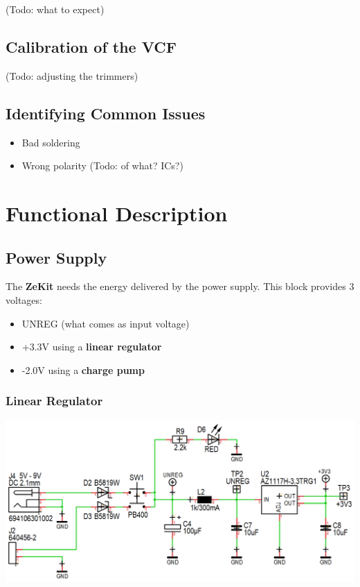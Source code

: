 \documentclass{scrartcl}
\begin{document}
 (Todo: what to expect)

\subsection{Calibration of the VCF}

(Todo: adjusting the trimmers)

\subsection{Identifying Common Issues}

\begin{itemize}
    \item Bad soldering
    \item Wrong polarity (Todo: of what? ICs?)
\end{itemize}

\pagebreak

\section{Functional Description}

\subsection{Power Supply}

The \textbf{ZeKit} needs the energy delivered by the power supply.
This block provides 3 voltages: 
\begin{itemize}
    \item UNREG (what comes as input voltage)
    \item +3.3V using a \textbf{linear regulator}
    \item -2.0V using a \textbf{charge pump}
\end{itemize}

\subsubsection{Linear Regulator}

\begin{center}
    \includegraphics[scale=0.4]{assets/schema-power.png}
\end{center}
\end{document}
